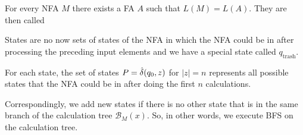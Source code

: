 \inlinetheorem For every NFA $M$ there exists a FA $A$ such that $L(M) = L(A)$. They are then called 


States are no now sets of states of the NFA in which the NFA could be in after processing the preceding input elements and we have a special state called $q_{\text{trash}}$.

For each state, the set of states $P = \hat{\delta}(q_0, z)$ for $|z| = n$ represents all possible states that the NFA could be in after doing the first $n$ calculations.

Correspondingly, we add new states if there is no other state that is in the same branch of the calculation tree $\mathcal{B}_M(x)$.
So, in other words, we execute BFS on the calculation tree.


